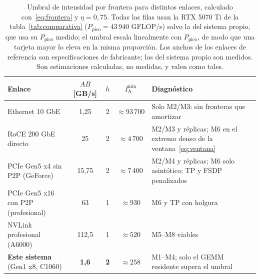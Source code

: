 \documentclass[a4paper,11pt]{article}
\begin{document}
\begin{table}[t]
\centering
\footnotesize
\setlength{\tabcolsep}{5pt}
\caption{Umbral de intensidad por frontera para distintos enlaces, calculado con~\eqref{eq:frontera} y $\eta = 0,75$. Todas las
filas usan la RTX 5070 Ti de la tabla~\ref{tab:comparativa} ($P_{\text{pico}} = 43\,940$ GFLOP/s) salvo la del sistema propio,
que usa su $P_{\text{pico}}$ medido; el umbral escala linealmente con $P_{\text{pico}}$, de modo que una tarjeta mayor lo eleva
en la misma proporción. Los anchos de los enlaces de referencia son especificaciones de fabricante; los del sistema propio son
medidos. Son estimaciones calculadas, no medidas, y valen como tales.}
\label{tab:enlaces}
\begin{tabular}{>{\raggedright\arraybackslash}p{4.0cm} c c c >{\raggedright\arraybackslash}p{5.2cm}}
\toprule
\textbf{Enlace} & \textbf{$AB$ [GB/s]} & \textbf{$h$} & \textbf{$I_{\text{A}}^{\text{min}}$} & \textbf{Diagnóstico} \\
\midrule
Ethernet 10 GbE & 1,25 & 2 & $\approx 93\,700$ & Solo M2/M3: sin fronteras que amortizar \\
RoCE 200 GbE directo~\cite{nvidiadgxspark} & 25 & 2 & $\approx 4\,700$ & M2/M3 y réplicas; M6 en el extremo denso de la ventana~\eqref{eq:ventana} \\
PCIe Gen5 x4 sin P2P (GeForce) & 15,75 & 2 & $\approx 7\,400$ & M2/M4 y réplicas; M6 solo asintótico; TP y FSDP penalizados \\
PCIe Gen5 x16 con P2P (profesional) & 63 & 1 & $\approx 930$ & M6 y TP con holgura \\
NVLink profesional (A6000)~\cite{nvidiaa6000} & 112,5 & 1 & $\approx 520$ & M5--M8 viables \\
\midrule
\textbf{Este sistema} (Gen1 x8, C1060) & \textbf{1,6} & \textbf{2} & $\approx 258$ & M1--M4; solo el GEMM residente supera el umbral \\
\bottomrule
\end{tabular}
\end{table}
\end{document}
